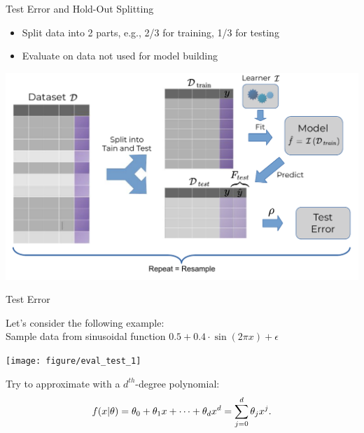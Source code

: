 \documentclass[11pt,compress,t,notes=noshow, xcolor=table]{beamer}
\newenvironment{knitrout}{}{} %
\begin{document}
\begin{vbframe}{Test Error and Hold-Out Splitting}
\begin{itemize}
  \item Split data into 2 parts, e.g., 2/3 for training, 1/3 for testing
  \item Evaluate on data not used for model building
\end{itemize}

\includegraphics[width=\textwidth]{figure_man/test_error.pdf}

\end{vbframe}

\begin{vbframe}{Test Error}

Let's consider the following example:\\
Sample data from sinusoidal function
$0.5 + 0.4 \cdot \sin (2 \pi x) + \epsilon$\\
\lz
\begin{knitrout}\scriptsize
{}\color{fgcolor}

{\centering \texttt{[image: figure/eval\_test\_1]} 

}



\end{knitrout}
Try to approximate with a $d^{th}$-degree polynomial:
\[ f(x | \theta) = \theta_0 + \theta_1 x + \cdots + \theta_d x^d = \sum_{j = 0}^{d} \theta_j x^j\text{.} \]
\end{vbframe}
\end{document}
